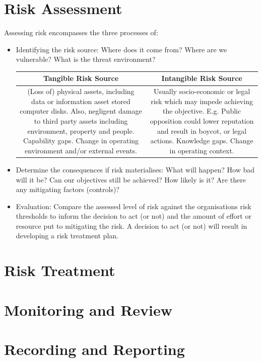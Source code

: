 \section{Risk Assessment}
Assessing risk encompasses the three processes of:
\begin{itemize}
	\item Identifying the risk source: Where does it come from? Where are we vulnerable? What is the threat environment?
	\begin{table}[h]
		\centering
		\begin{tabular}{c|c}
		\textbf{Tangible Risk Source} &\textbf{Intangible Risk Source} \\
		\hline
		\begin{minipage}{7cm}\subitem(Loss of) physical assets, including data or information asset stored computer disks.
		\subitem Also, negligent damage to third party assets including environment, property and people.
		\subitem Capability gaps.
		\subitem Change in operating environment and/or external events.
		\end{minipage} &\begin{minipage}{6cm}\subitem Usually socio-economic or legal risk which may impede achieving the objective. E.g. Public opposition could lower reputation and result in boycot, or legal actions.
		\subitem Knowledge gaps.
		\subitem Change in operating context.
		\end{minipage} \\
		\hline
		\end{tabular}
	\end{table}
	\item Determine the consequences if risk materialises: What will happen? How bad will it be? Can our objectives still be achieved? How likely is it? Are there any mitigating factors (controls)?
	\item Evaluation: Compare the assessed level of risk against the organisations risk thresholds to inform the decision to act (or not) and the amount of effort or resource put to mitigating the risk.
	A decision to act (or not) will result in developing a risk treatment plan.
\end{itemize}
\section{Risk Treatment}
\section{Monitoring and Review}
\section{Recording and Reporting}

